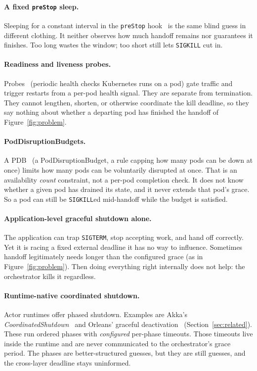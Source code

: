 \documentclass[AMA,Times1COL]{WileyNJDv5}
\begin{document}
\paragraph{A fixed \texttt{preStop} sleep.} Sleeping for a constant interval in the
\texttt{preStop} hook~\cite{k8sgraceful} is the same blind guess in different clothing. It neither
observes how much handoff remains nor guarantees it finishes. Too long wastes the window; too short
still lets \texttt{SIGKILL} cut in.

\paragraph{Readiness and liveness probes.} Probes~\cite{k8sgraceful} (periodic health checks
Kubernetes runs on a pod) gate traffic and trigger restarts from a per-pod health signal. They are
separate from termination. They cannot lengthen, shorten, or otherwise coordinate the kill deadline, so
they say nothing about whether a departing pod has finished the handoff of Figure~\ref{fig:problem}.

\paragraph{PodDisruptionBudgets.} A PDB~\cite{k8sPDB} (a PodDisruptionBudget, a rule capping how many
pods can be down at once) limits how many pods can be voluntarily disrupted at once. That is an
availability \emph{count} constraint, not a per-pod completion check. It does not know whether a given
pod has drained its state, and it never extends that pod's grace. So a pod can still be
\texttt{SIGKILL}ed mid-handoff while the budget is satisfied.

\paragraph{Application-level graceful shutdown alone.} The application can trap \texttt{SIGTERM},
stop accepting work, and hand off correctly. Yet it is racing a fixed external deadline it has no
way to influence. Sometimes handoff legitimately needs longer than the configured grace (as in
Figure~\ref{fig:problem}). Then doing everything right internally does not help: the orchestrator kills
it regardless.

\paragraph{Runtime-native coordinated shutdown.} Actor runtimes offer phased shutdown. Examples are
Akka's \emph{CoordinatedShutdown}~\cite{akkacoordinated} and Orleans' graceful
deactivation~\cite{orleans} (Section~\ref{sec:related}). These run ordered phases with \emph{configured}
per-phase timeouts. Those timeouts live inside the runtime and are never communicated to the
orchestrator's grace period. The phases are better-structured guesses, but they are still guesses, and
the cross-layer deadline stays uninformed.
\end{document}
